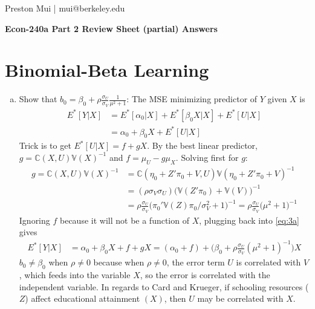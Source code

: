 \documentclass{article}[12pt]
\begin{document}
\begin{center}
	Preston Mui | mui@berkeley.edu

	{\bf Econ-240a Part 2 Review Sheet (partial) Answers}
\end{center}

\setcounter{section}{2}

\section{Binomial-Beta Learning}
\begin{enumerate}[(a)]
	\item Show that $b_0 = \beta_0 + \rho \frac{\sigma_U}{\sigma_V} \frac{1}{\mu^2 + 1}$: The MSE minimizing predictor of $Y$ given $X$ is
	\begin{align}
		E^*[Y | X] &= E^*[\alpha_0 | X ] + E^*[\beta_0 X | X] + E^*[U | X] \nonumber \\
		&= \alpha_0 + \beta_0 X + E^*[U | X] \label{eq:3a}
	\end{align}
	Trick is to get $E^*[U | X] = f + gX$. By the best linear predictor, $g = \mathbb{C}(X,U) \mathbb{V}(X)^{-1}$ and $f = \mu_U - g \mu_X$. Solving first for $g$:
	\begin{align*}
		g = \mathbb{C}(X,U) \mathbb{V}(X)^{-1} &= \mathbb{C}(\eta_0 + Z' \pi_0 + V,U) \mathbb{V}(\eta_0 + Z'\pi_0 + V)^{-1} \\
		&= (\rho \sigma_V \sigma_U) \Big(\mathbb{V}(Z'\pi_0) + \mathbb{V}(V) \Big)^{-1} \\
		&= \rho \frac{\sigma_U}{\sigma_V}\Big( \pi_0' \mathbb{V}(Z) \pi_0/ \sigma_V^2 + 1 \Big)^{-1} = \rho \frac{\sigma_U}{\sigma_V}\Big( \mu^2 + 1 \Big)^{-1}
	\end{align*}
	Ignoring $f$ because it will not be a function of $X$, plugging back into \eqref{eq:3a} gives
	\begin{align*}
		E^*[Y | X] &= \alpha_0 + \beta_0 X + f + gX = (\alpha_0 + f) + \Big(\beta_0 + \rho \frac{\sigma_U}{\sigma_V}( \mu^2 + 1 )^{-1}\Big) X
	\end{align*}
	$b_0 \neq \beta_0$ when $\rho \neq 0$ because when $\rho \neq 0$, the error term $U$ is correlated with $V$, which feeds into the variable $X$, so the error is correlated with the independent variable. In regards to Card and Krueger, if schooling resources ($Z$) affect educational attainment $(X)$, then $U$ may be correlated with $X$.
	

\end{enumerate}
\end{document}
